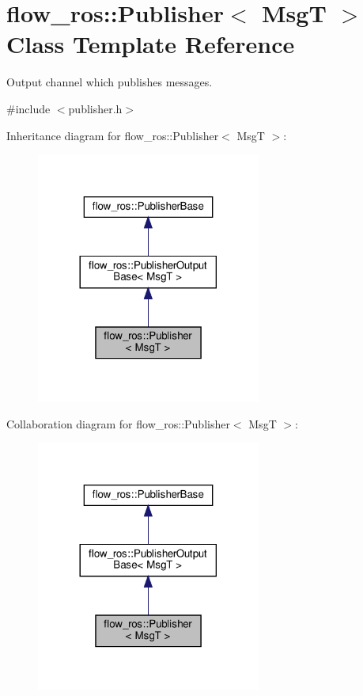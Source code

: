 \hypertarget{classflow__ros_1_1_publisher}{}\section{flow\+\_\+ros\+:\+:Publisher$<$ MsgT $>$ Class Template Reference}
\label{classflow__ros_1_1_publisher}


Output channel which publishes messages.  




{\ttfamily \#include $<$publisher.\+h$>$}



Inheritance diagram for flow\+\_\+ros\+:\+:Publisher$<$ MsgT $>$\+:\nopagebreak
\begin{figure}[H]
\begin{center}
\leavevmode
\includegraphics[width=209pt]{classflow__ros_1_1_publisher__inherit__graph}
\end{center}
\end{figure}


Collaboration diagram for flow\+\_\+ros\+:\+:Publisher$<$ MsgT $>$\+:\nopagebreak
\begin{figure}[H]
\begin{center}
\leavevmode
\includegraphics[width=209pt]{classflow__ros_1_1_publisher__coll__graph}
\end{center}
\end{figure}
